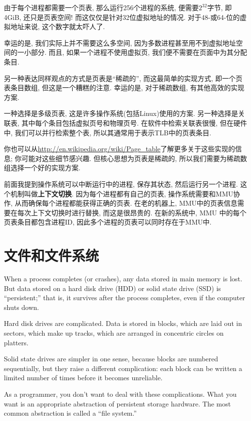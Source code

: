 \documentclass[12pt]{book}
\begin{document}
{由于每个进程都需要一个页表, 
那么运行256个进程的系统, 便需要$2^{32}$字节, 即 4GiB, 还只是页表空间!
而这仅仅是针对32位虚拟地址的情况.
对于48-或64-位的虚拟地址来说, 这个数字就太吓人了.

幸运的是, 我们实际上并不需要这么多空间,
因为多数进程甚至用不到虚拟地址空间的一小部分.
而且, 如果一个进程不使用虚拟页, 我们便不需要在页面中为其分配条目.

另一种表达同样观点的方式是页表是``稀疏的'',
而这最简单的实现方式, 即一个页表条目数组, 但这是一个糟糕的注意.
幸运的是, 对于稀疏数组, 有其他高效的实现方案.

一种选择是多级页表, 这是许多操作系统(包括Linux)使用的方案.
另一种选择是关联表, 其中每个条目包括虚拟页号和物理页号.
在软件中检索关联表很慢, 但在硬件中, 我们可以并行检索整个表,
所以其通常用于表示TLB中的页表条目.

你也可以从\url{http://en.wikipedia.org/wiki/Page_table}了解更多关于这些实现的信息;
你可能对这些细节感兴趣.
但核心思想为页表是稀疏的, 所以我们需要为稀疏数组选择一个好的实现方案.

前面我提到操作系统可以中断运行中的进程, 保存其状态, 然后运行另一个进程.
这个机制叫做{\bf 上下文切换}. 因为每个进程都有自己的页表, 操作系统需要和MMU协作,
从而确保每个进程都能获得正确的页表.
在老的机器上, MMU中的页表信息需要在每次上下文切换时进行替换, 
而这是很昂贵的.
在新的系统中, MMU 中的每个页表条目都包含进程ID, 因此多个进程的页表可以同时存在于MMU中.


\chapter{文件和文件系统}

When a process completes (or crashes), any data stored in main
memory is lost.  But data stored on a hard disk drive (HDD) or
solid state drive (SSD) is ``persistent;'' that is, it survives
after the process completes, even if the computer shuts down.

Hard disk drives are complicated.  Data is stored in blocks, which
are laid out in sectors, which make up tracks, which are arranged
in concentric circles on platters.

Solid state drives are simpler in one sense, because blocks are
numbered sequentially, but they raise a different complication: each
block can be written a limited number of times before it becomes
unreliable.

As a programmer, you don't want to deal with these complications.
What you want is an appropriate abstraction of persistent storage
hardware.  The most common abstraction is called a ``file system.''

}
\end{document}
